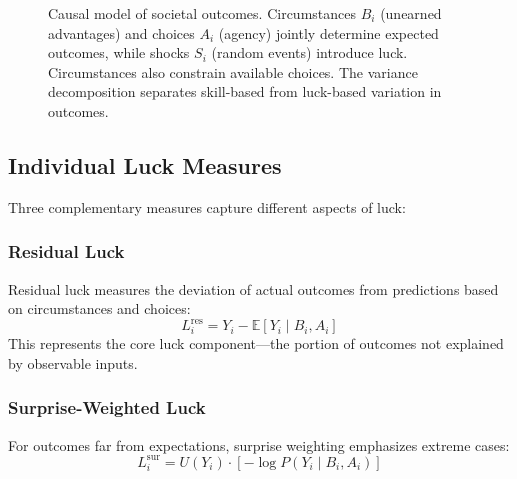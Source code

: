 \begin{figure}[H]
  \caption{Causal model of societal outcomes. Circumstances $B_{i}$ (unearned
  advantages) and choices $A_{i}$ (agency) jointly determine expected outcomes,
  while shocks $S_{i}$ (random events) introduce luck. Circumstances also
  constrain available choices. The variance decomposition separates
  skill-based from luck-based variation in outcomes.}
  \label{fig:causal}
\end{figure}

\subsection{Individual Luck Measures}

Three complementary measures capture different aspects of luck:

\subsubsection{Residual Luck}

Residual luck measures the deviation of actual outcomes from predictions
based on circumstances and choices:
\begin{equation}
  L_{i}^{\text{res}}= Y_{i}- \mathbb{E}[Y_{i}\mid B_{i}, A_{i}]
\end{equation}
This represents the core luck component—the portion of outcomes not
explained by observable inputs.

\subsubsection{Surprise-Weighted Luck}

For outcomes far from expectations, surprise weighting emphasizes
extreme cases:
\begin{equation}
  L_{i}^{\text{sur}}= U(Y_{i}) \cdot \left[-\log P(Y_{i}\mid B_{i}, A_{i}
  )\right]
\end{equation}

